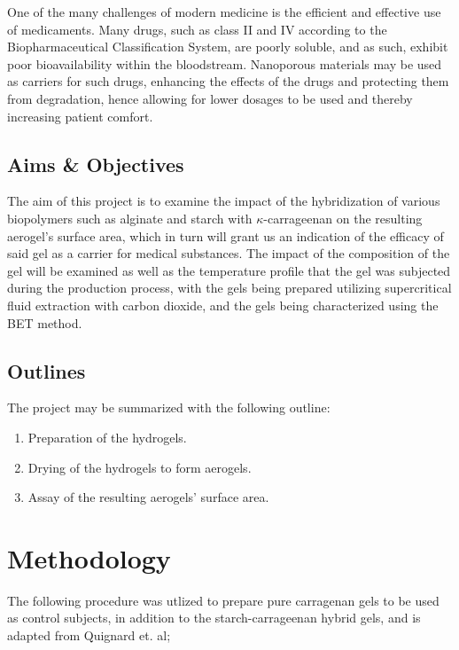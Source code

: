 \documentclass[a4paper,12pt]{article}
\begin{document}
One of the many challenges of modern medicine is the efficient and effective use of medicaments. Many drugs, such as class II and IV according to the Biopharmaceutical Classification System, are poorly soluble, and as such, exhibit poor bioavailability within the bloodstream. Nanoporous materials may be used as carriers for such drugs, enhancing the effects of the drugs and protecting them from degradation, hence allowing for lower dosages to be used and thereby increasing patient comfort.\supercite{ulker_emerging_2014}

\subsection{Aims \& Objectives}

The aim of this project is to examine the impact of the hybridization of various biopolymers such as alginate and starch with $\kappa$-carrageenan on the resulting aerogel's surface area, which in turn will grant us an indication of the efficacy of said gel as a carrier for medical substances. The impact of the composition of the gel will be examined as well as the temperature profile that the gel was subjected during the production process, with the gels being prepared utilizing supercritical fluid extraction with carbon dioxide, and the gels being characterized using the BET method.

\subsection{Outlines}

The project may be summarized with the following outline:

\begin{enumerate}
	\item Preparation of the hydrogels.
	\item Drying of the hydrogels to form aerogels.
	\item Assay of the resulting aerogels' surface area.
\end{enumerate}

\newpage

\section{Methodology}

The following procedure was utlized to prepare pure carragenan gels to be used as control subjects, in addition to the starch-carrageenan hybrid gels, and is adapted from Quignard et. al\supercite{quignard_aerogel_2008};
\end{document}
